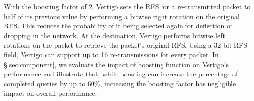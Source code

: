 

With the boosting factor of 2, Vertigo sets the RFS for a re-transmitted packet to half of its previous value by performing a bitwise right rotation on the original RFS. 
This reduces the probability of it being selected again for deflection or dropping in the network.
At the destination, Vertigo performs bitwise left rotations on the packet to retrieve the packet's original RFS. Using a 32-bit RFS field, Vertigo can support up to 16 re-transmissions for every packet. In \S\ref{sec:component}, we  evaluate the impact of boosting function on Vertigo's performance and illustrate that, while boosting can increase the percentage of completed queries by up to 60\%, increasing the boosting factor has negligible impact on overall performance.



